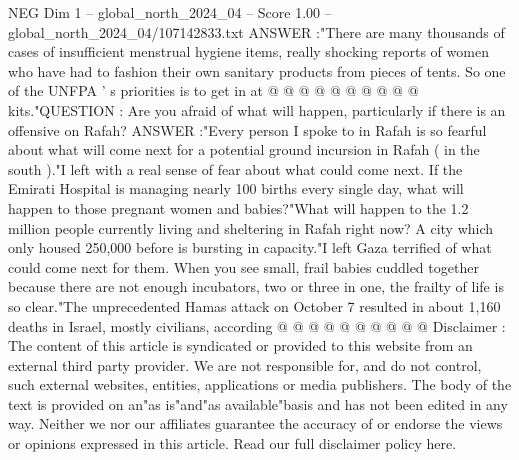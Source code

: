 \begin{textsample}{NEG Dim 1 – global\_north\_2024\_04 – Score 1.00 – global\_north\_2024\_04/107142833.txt}
ANSWER :"There are many thousands of cases of insufficient menstrual hygiene items, really shocking reports of women who have had to fashion their own sanitary products from pieces of tents.
So one of the UNFPA ' s priorities is to get in at @ @ @ @ @ @ @ @ @ @ kits."QUESTION : Are you afraid of what will happen, particularly if there is an offensive on Rafah?
ANSWER :"Every person I spoke to in Rafah is so fearful about what will come next for a potential ground incursion in Rafah ( in the south )."I left with a real sense of fear about what could come next.
If the Emirati Hospital is managing nearly 100 births every single day, what will happen to those pregnant women and babies?"What will happen to the 1.2 million people currently living and sheltering in Rafah right now?
A city which only housed 250,000 before is bursting in capacity."I left Gaza terrified of what could come next for them.
When you see small, frail babies cuddled together because there are not enough incubators, two or three in one, the frailty of life is so clear."The unprecedented Hamas attack on October 7 resulted in about 1,160 deaths in Israel, mostly civilians, according @ @ @ @ @ @ @ @ @ @ Disclaimer : The content of this article is syndicated or provided to this website from an external third party provider.
We are not responsible for, and do not control, such external websites, entities, applications or media publishers.
The body of the text is provided on an"as is"and"as available"basis and has not been edited in any way.
Neither we nor our affiliates guarantee the accuracy of or endorse the views or opinions expressed in this article.
Read our full disclaimer policy here.

\end{textsample}
